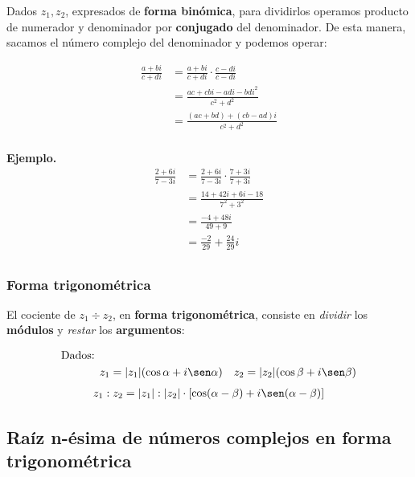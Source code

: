 \documentclass[12pt]{article}
\begin{document}
Dados \(z_{1}, z_{2}\),
expresados de \textbf{forma binómica},
para dividirlos operamos producto de numerador y denominador por
\textbf{conjugado} del denominador.
De esta manera, sacamos el número complejo del denominador y podemos operar:

\begin{align*}
    \frac{a + bi}{c + di} & = \frac{a + bi}{c + di} \cdot \frac{c - di}{c - di} \\
                          & = \frac{ac + cbi - adi - bdi^2}{c^2 + d^2}          \\
                          & = \frac{(ac + bd) + (cb - ad)i}{c^2 + d^2}          \\
\end{align*}

\textbf{Ejemplo.}
\begin{align*}
    \frac{2+6i}{7-3i} & = \frac{2+6i}{7-3i} \cdot \frac{7+3i}{7+3i} \\
                      & = \frac{14 + 42i + 6i - 18}{7^{2} + 3^{2}}  \\
                      & = \frac{-4 + 48i}{49 + 9}                   \\
                      & = \boxed{\frac{-2}{29} + \frac{24}{29}i}    \\
\end{align*}

\subsubsection{Forma trigonométrica}

El cociente de \(z_{1} \div z_{2}\),
en \textbf{forma trigonométrica},
consiste en \textit{dividir} los \textbf{módulos} y
\textit{restar} los \textbf{argumentos}:

\begin{align*}
    \text{Dados: } &                                                                                     \\
                   & z_{1} = |z_{1}|(\cos\alpha + i\sen\alpha) & z_{2} = |z_{2}|(\cos\beta + i\sen\beta) \\
\end{align*}
\begin{align*}
    z_{1} : z_{2} = |z_{1}| : |z_{2}| \cdot [\cos(\alpha-\beta) + i\sen(\alpha-\beta)] \\
\end{align*}

\subsection{Raíz n-ésima de números complejos en forma trigonométrica}
\end{document}
